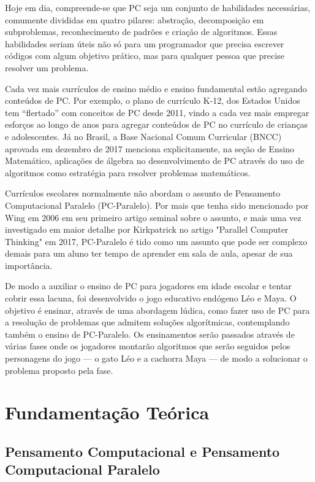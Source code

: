 \documentclass[conference]{IEEEtran}
\begin{document}
Hoje em dia, compreende-se que PC seja um conjunto de habilidades necessárias, comumente divididas em quatro pilares: abstração, decomposição em subproblemas, reconhecimento de padrões e criação de algoritmos\cite{b3}. Essas habilidades seriam úteis não só para um programador que precisa escrever códigos com algum objetivo prático, mas para qualquer pessoa que precise resolver um problema.

Cada vez mais currículos de ensino médio e ensino fundamental estão agregando conteúdos de PC. Por exemplo, o plano de currículo K-12, dos Estados Unidos tem ``flertado'' com conceitos de PC desde 2011\cite{b1}, vindo a cada vez mais empregar esforços ao longo de anos para agregar conteúdos de PC no currículo de crianças e adolescentes. Já no Brasil, a Base Nacional Comum Curricular (BNCC) aprovada em dezembro de 2017 menciona explicitamente, na seção de Ensino Matemático, aplicações de álgebra no desenvolvimento de PC através do uso de algoritmos como estratégia para resolver problemas matemáticos\cite{b4}.

Currículos escolares normalmente não abordam o assunto de Pensamento Computacional Paralelo (PC-Paralelo). Por mais que tenha sido mencionado por Wing em 2006 em seu primeiro artigo seminal sobre o assunto, e mais uma vez investigado em maior detalhe por Kirkpatrick no artigo "Parallel Computer Thinking" em 2017, PC-Paralelo é tido como um assunto que pode ser complexo demais para um aluno ter tempo de aprender em sala de aula, apesar de sua importância\cite{b5}.

De modo a auxiliar o ensino de PC para jogadores em idade escolar e tentar cobrir essa lacuna,  foi desenvolvido o jogo educativo endógeno Léo e Maya.  O objetivo é ensinar, através de uma abordagem lúdica, como fazer uso de PC para a resolução de problemas que admitem soluções algorítmicas, contemplando também o ensino de PC-Paralelo. Os ensinamentos serão passados através de várias fases onde os jogadores montarão algoritmos que serão seguidos pelos personagens do jogo — o gato Léo e a cachorra Maya — de modo a solucionar o problema proposto pela fase.

\section{Fundamentação Teórica}

\subsection{Pensamento Computacional e Pensamento Computacional Paralelo}
\end{document}
